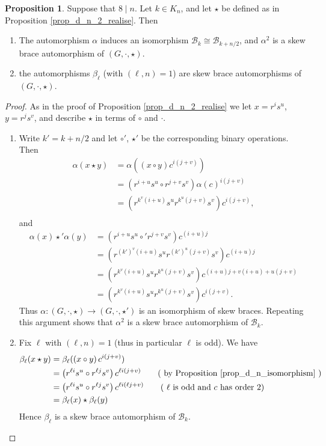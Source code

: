 \documentclass[reqno]{amsart}
\theoremstyle{definition}
\newtheorem{proposition}[theorem]{Proposition}
\begin{document}
\begin{proposition} \label{prop_d_n_2_isomorphism}
Suppose that $ 8 \mid n $. Let $ k \in K_{n} $, and let $ \star $ be defined as in Proposition \ref{prop_d_n_2_realise}. Then 
\begin{enumerate}
\item The automorphism $ \alpha $ induces an isomorphism $ \mathscr{B}_{k} \cong \mathscr{B}_{k+n/2} $, and $ \alpha^{2} $ is a skew brace automorphism of $ (G,\cdot,\star) $. 
\item the automorphisms $ \beta_{\ell} $ (with $ (\ell,n)=1 $) are skew brace automorphisms of $ (G,\cdot,\star) $. 
\end{enumerate}
\end{proposition}
\begin{proof}
As in the proof of Proposition \ref{prop_d_n_2_realise} we let $ x=r^{i}s^{u} $, $ y=r^{j}s^{v} $, and describe $ \star $ in terms of $ \circ $ and $ \cdot $. 
\begin{enumerate}
\item Write $ k' = k + n/2 $ and let $ \circ' $, $ \star' $ be the corresponding binary operations. Then
\begin{align*}
\alpha( x \star y ) &= \alpha( \left( x \circ y \right)c^{i(j+v)}) \\
&= \left( r^{i+u}s^{u} \circ r^{j+v}s^{v} \right) \alpha(c)^{i(j+v)} \\
&= \left( r^{k^{v}(i+u)}s^{u}r^{k^{u}(j+v)}s^{v} \right) c^{i(j+v)}, \\
\end{align*}
and
\begin{align*}
\alpha(x) \star' \alpha(y) &= (r^{i+u}s^{u} \circ' r^{j+v}s^{v})c^{(i+u)j}  \\
&= \left( r^{(k')^{v}(i+u)}s^{u}r^{(k')^{u}(j+v)}s^{v} \right)c^{(i+u)j} \\
&= \left( r^{k^{v}(i+u)}s^{u}r^{k^{u}(j+v)}s^{v} \right)c^{(i+u)j+v(i+u)+u(j+v)} \\
&= \left( r^{k^{v}(i+u)}s^{u}r^{k^{u}(j+v)}s^{v} \right)c^{i(j+v)}. 
\end{align*} 
Thus $ \alpha : (G,\cdot,\star) \rightarrow (G,\cdot,\star') $ is an isomorphism of skew braces. Repeating this argument shows that $ \alpha^{2} $ is a skew brace automorphism of $ \mathscr{B}_{k} $. 
%
\item Fix $ \ell $ with $ (\ell,n)=1 $ (thus in particular $ \ell $ is odd). We have
\begin{align*}
\beta_{\ell} ( x \star y ) &= \beta_{\ell}( \left( x \circ y \right)c^{i(j+v)}) \\
&= \left( r^{\ell i}s^{u} \circ r^{\ell j} s^{v} \right) c^{\ell i(j+v)} \tag{ by Proposition \ref{prop_d_n_isomorphism} } \\
&= \left( r^{\ell i}s^{u} \circ r^{\ell j} s^{v} \right) c^{\ell i(\ell j+v)} \tag{ $ \ell $ is odd and $ c $ has order $ 2 $} \\
&= \beta_{\ell}(x) \star \beta_{\ell}(y) 
\end{align*}
Hence $ \beta_{\ell} $ is a skew brace automorphism of $ \mathscr{B}_{k} $. 
\end{enumerate}
\end{proof}
\end{document}
